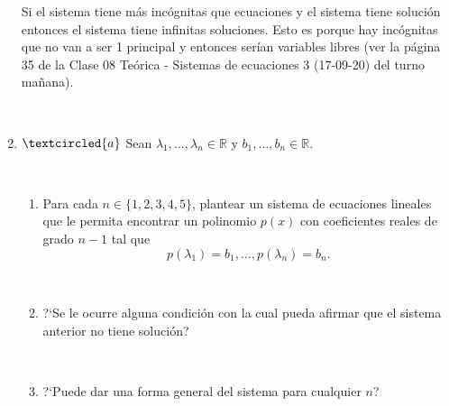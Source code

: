 \documentclass[12pt,reqno]{amsart}
\newcommand{\R}{\mathbb R}
\begin{document}
\begin{enumerate}
Si el sistema tiene m\'as inc\'ognitas que ecuaciones y el sistema tiene soluci\'on entonces el sistema tiene infinitas soluciones. Esto es porque hay inc\'ognitas que no van a ser 1 principal y entonces ser\'ian variables libres (ver la p\'agina 35 de la Clase 08 Teórica - Sistemas de ecuaciones 3 (17-09-20) del turno ma\~nana).

\

\item\label{polinomios} $\textcircled{a}$ Sean $\lambda_1, ..., \lambda_n\in\R$ y $b_1, ..., b_n\in\R$.

\

\begin{enumerate}
 \item Para cada $n\in\{1,2,3,4,5\}$, plantear un sistema de ecuaciones lineales que le permita encontrar un polinomio $p(x)$ con coeficientes reales de grado $n-1$ tal que
 $$
 p(\lambda_1)=b_1, \dots, p(\lambda_n)=b_n.
 $$

 \

\item ?`Se le ocurre alguna condición con la cual pueda afirmar que el sistema anterior no tiene solución?

\

\item  ?`Puede dar una forma general del sistema para cualquier $n$?

\end{enumerate}



\end{enumerate}
\end{document}
